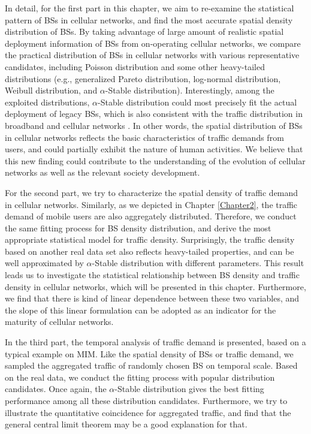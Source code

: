 In detail, for the first part in this chapter, we aim to re-examine the statistical pattern of BSs in cellular networks, and find the most accurate spatial density distribution of BSs. By taking advantage of large amount of realistic spatial deployment information of BSs from on-operating cellular networks, we compare the practical distribution of BSs in cellular networks with various representative candidates, including Poisson distribution and some other heavy-tailed distributions (e.g., generalized Pareto distribution, log-normal distribution, Weibull distribution, and $\alpha$-Stable distribution). Interestingly, among the exploited distributions, $\alpha$-Stable distribution could most precisely fit the actual deployment of legacy BSs, which is also consistent with the traffic distribution in broadband and cellular networks \cite{crovella1997self,gallardo2000use}. In other words, the spatial distribution of BSs in cellular networks reflects the basic characteristics of traffic demands from users, and could partially exhibit the nature of human activities. We believe that this new finding could contribute to the understanding of the evolution of cellular networks as well as the relevant society development.

For the second part, we try to characterize the spatial density of traffic demand in cellular networks. Similarly, as we depicted in Chapter \ref{Chapter2}, the traffic demand of mobile users are also aggregately distributed. Therefore, we conduct the same fitting process for BS density distribution, and derive the most appropriate statistical model for traffic density. Surprisingly, the traffic density based on another real data set also reflects heavy-tailed properties, and can be well approximated by $\alpha$-Stable distribution with different parameters. This result leads us to investigate the statistical relationship between BS density and traffic density in cellular networks, which will be presented in this chapter. Furthermore, we find that there is kind of linear dependence between these two variables, and the slope of this linear formulation can be adopted as an indicator for the maturity of cellular networks.

In the third part, the temporal analysis of traffic demand is presented, based on a typical example on MIM. Like the spatial density of BSs or traffic demand, we sampled the aggregated traffic of randomly chosen BS on temporal scale. Based on the real data, we conduct the fitting process with popular distribution candidates. Once again, the $\alpha$-Stable distribution gives the best fitting performance among all these distribution candidates. Furthermore, we try to illustrate the quantitative coincidence for aggregated traffic, and find that the general central limit theorem may be a good explanation for that.

